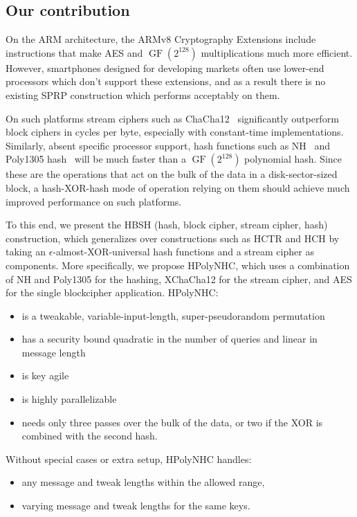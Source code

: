 \documentclass[journal=tosc,preprint,floatrow,submission]{iacrtrans}
\DeclareMathOperator{\GF}{GF}
\begin{document}
\subsection{Our contribution}
On the ARM architecture, the ARMv8 Cryptography Extensions include instructions that make
AES and $\GF(2^{128})$ multiplications much more efficient. However,
smartphones designed for developing markets
often use lower-end processors which
don't support these extensions, and as a result there is no existing SPRP construction which performs
acceptably on them.

On such platforms stream ciphers such as ChaCha12~\cite{chacha} significantly
outperform block ciphers in cycles per byte, especially with constant-time implementations.
Similarly, absent specific processor support, hash functions such as NH~\cite{nh} and
Poly1305 hash~\cite{poly1305} will be much faster
than a $\GF(2^{128})$ polynomial hash. Since these are the operations that act on the bulk of
the data in a disk-sector-sized block, a hash-XOR-hash
mode of operation relying on them should achieve
much improved performance on such platforms.

To this end, we present the HBSH (hash, block cipher, stream cipher, hash)
construction, which generalizes over constructions such as
HCTR and HCH by taking an $\epsilon$-almost-XOR-universal hash functions and a stream cipher
as components. More specifically, we propose HPolyNHC,
which uses a combination of NH and Poly1305 for the hashing, XChaCha12 for the stream cipher, and
AES for the single blockcipher application. HPolyNHC:
\begin{itemize}
    \item is a tweakable, variable-input-length, super-pseudorandom permutation
    \item has a security bound quadratic in the number of queries and linear in message length
    \item is key agile
    \item is highly parallelizable
    \item needs only three passes over the bulk of the data, or
        two if the XOR is combined with the second hash.
\end{itemize}

Without special cases or extra setup, HPolyNHC handles:
\begin{itemize}
    \item any message and tweak lengths within the allowed range,
    \item varying message and tweak lengths for the same keys.
\end{itemize}
\end{document}
